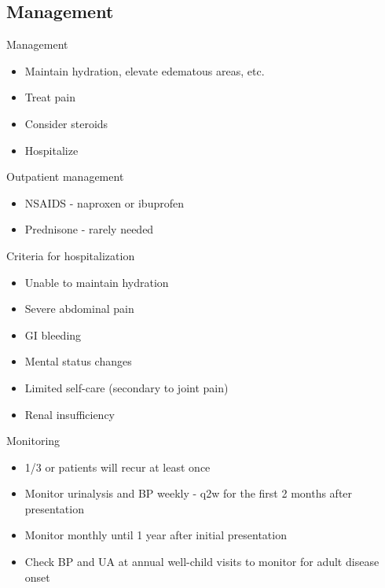 \subsection{Management}\label{management}

\begin{frame}{Management}

\begin{itemize}
\itemsep1pt\parskip0pt
\item
  Maintain hydration, elevate edematous areas, etc.
\item
  Treat pain
\item
  Consider steroids
\item
  Hospitalize
\end{itemize}

\end{frame}

\begin{frame}{Outpatient management}

\begin{itemize}
\itemsep1pt\parskip0pt
\item
  NSAIDS - naproxen or ibuprofen
\item
  Prednisone - rarely needed
\end{itemize}

\end{frame}

\begin{frame}{Criteria for hospitalization}

\begin{itemize}
\itemsep1pt\parskip0pt
\item
  Unable to maintain hydration
\item
  Severe abdominal pain
\item
  GI bleeding
\item
  Mental status changes
\item
  Limited self-care (secondary to joint pain)
\item
  Renal insufficiency
\end{itemize}

\end{frame}

\begin{frame}{Monitoring}

\begin{itemize}
\itemsep1pt\parskip0pt
\item
  1/3 or patients will recur at least once
\item
  Monitor urinalysis and BP weekly - q2w for the first 2 months after
  presentation
\item
  Monitor monthly until 1 year after initial presentation
\item
  Check BP and UA at annual well-child visits to monitor for adult
  disease onset
\end{itemize}

\end{frame}

